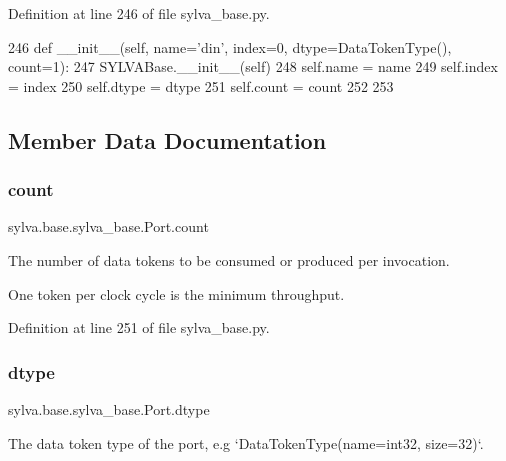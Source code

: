 Definition at line 246 of file sylva\+\_\+base.\+py.


\begin{DoxyCode}
246     \textcolor{keyword}{def }\_\_init\_\_(self, name='din', index=0, dtype=DataTokenType(), count=1):
247         SYLVABase.\_\_init\_\_(self)
248         self.name = name
249         self.index = index
250         self.dtype = dtype
251         self.count = count
252 
253 
\end{DoxyCode}


\subsection{Member Data Documentation}
\mbox{\label{classsylva_1_1base_1_1sylva__base_1_1_port_a3d01efab6495163880ccf499970f62fe}} 
\subsubsection{\texorpdfstring{count}{count}}
{\footnotesize\ttfamily sylva.\+base.\+sylva\+\_\+base.\+Port.\+count}



The number of data tokens to be consumed or produced per invocation. 

One token per clock cycle is the minimum throughput. 

Definition at line 251 of file sylva\+\_\+base.\+py.

\mbox{\label{classsylva_1_1base_1_1sylva__base_1_1_port_a442668943cd208f89f54bb6613b4f514}} 
\subsubsection{\texorpdfstring{dtype}{dtype}}
{\footnotesize\ttfamily sylva.\+base.\+sylva\+\_\+base.\+Port.\+dtype}



The data token type of the port, e.\+g `\+Data\+Token\+Type(name=\textquotesingle{}int32\textquotesingle{}, size=32)`. 



